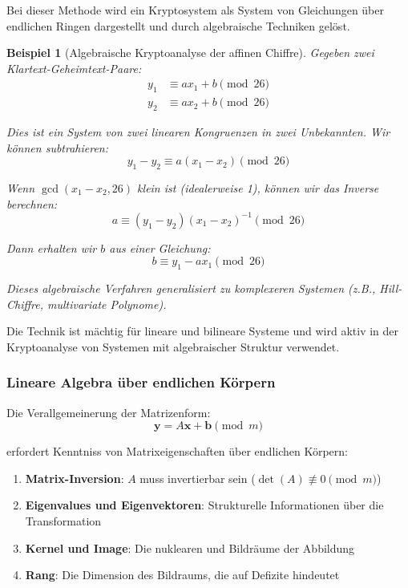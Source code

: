 ﻿\documentclass[12pt,a4paper]{article}
\newtheorem{example}{Beispiel}
\begin{document}
	Bei dieser Methode wird ein Kryptosystem als System von Gleichungen über endlichen Ringen dargestellt und durch algebraische Techniken gelöst.
	
	\begin{example}[Algebraische Kryptoanalyse der affinen Chiffre]
		Gegeben zwei Klartext-Geheimtext-Paare:
		\begin{align}
			y_1 &\equiv ax_1 + b \pmod{26} \\
			y_2 &\equiv ax_2 + b \pmod{26}
		\end{align}
		
		Dies ist ein System von zwei linearen Kongruenzen in zwei Unbekannten. Wir können subtrahieren:
		\begin{equation}
			y_1 - y_2 \equiv a(x_1 - x_2) \pmod{26}
		\end{equation}
		
		Wenn $\gcd(x_1 - x_2, 26)$ klein ist (idealerweise 1), können wir das Inverse berechnen:
		\begin{equation}
			a \equiv (y_1 - y_2)(x_1 - x_2)^{-1} \pmod{26}
		\end{equation}
		
		Dann erhalten wir $b$ aus einer Gleichung:
		\begin{equation}
			b \equiv y_1 - ax_1 \pmod{26}
		\end{equation}
		
		Dieses algebraische Verfahren generalisiert zu komplexeren Systemen (z.B., Hill-Chiffre, multivariate Polynome).
	\end{example}
	
	Die Technik ist mächtig für lineare und bilineare Systeme und wird aktiv in der Kryptoanalyse von Systemen mit algebraischer Struktur verwendet.
	
	\subsubsection{Lineare Algebra über endlichen Körpern}
	
	Die Verallgemeinerung der Matrizenform:
	\begin{equation}
		\mathbf{y} = A\mathbf{x} + \mathbf{b} \pmod{m}
	\end{equation}
	
	erfordert Kenntniss von Matrixeigenschaften über endlichen Körpern:
	\begin{enumerate}
		\item \textbf{Matrix-Inversion}: $A$ muss invertierbar sein ($\det(A) \not\equiv 0 \pmod{m}$)
		\item \textbf{Eigenvalues und Eigenvektoren}: Strukturelle Informationen über die Transformation
		\item \textbf{Kernel und Image}: Die nuklearen und Bildräume der Abbildung
		\item \textbf{Rang}: Die Dimension des Bildraums, die auf Defizite hindeutet
	\end{enumerate}
	
\end{document}
